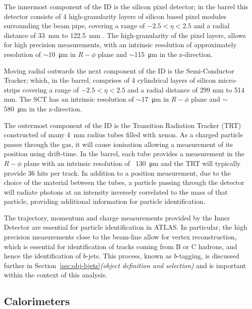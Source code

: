 The innermost component of the ID is the silicon pixel detector;
in the barrel this detector consists of 4 high-granularity layers of silicon based pixel modules surrounding the beam pipe,
covering a range of $-2.5 < \eta < 2.5$ and a radial distance of \SI{33}{mm} to \SI{122.5}{mm} \cite{det-IBL_TDR, det-IBL_Talk}.
The high-granularity of the pixel layers, allows for high precision measurements,
with an intrinsic resolution of approximately resolution of $\sim$\SI{10}{\micro\metre} in $R-\phi$ plane
and $\sim$\SI{115}{\micro\metre} in the z-direction. 

Moving radial outwards the next component of the ID is the Semi-Conductor Tracker;
which, in the barrel, comprises of 4 cylindrical layers of silicon micro-strips
covering a range of $-2.5 < \eta < 2.5$ and a radial distance of 299 mm to 514 mm.
The SCT has an intrinsic resolution of $\sim$\SI{17}{\micro\metre} in $R-\phi$ plane
and $\sim$\SI{580}{\micro\metre} in the z-direction. 

The outermost component of the ID is the Transition Radiation Tracker (TRT)
constructed of many \SI{4}{\mm} radius tubes filled with xenon.
As a charged particle passes through the gas,
it will cause ionisation allowing a measurement of its position using drift-time.
In the barrel, each tube provides a measurement in the $R-\phi$ plane
with an intrinsic resolution of ~\SI{130}{\micro\metre}
and the TRT will typically provide 36 hits per track.
In addition to a position measurement, due to the choice of the material between the tubes,
a particle passing through the detector will radiate photons
at an intensity inversely correlated to the mass of that particle,
providing additional information for particle identification. 

The trajectory, momentum and charge measurements provided by the Inner Detector are essential for particle identification in ATLAS.
In particular, the high precision measurements close to the beam-line allow for vertex reconstruction,
which is essential for identification of tracks coming from B or C hadrons, and hence the identification of $b$-jets.
This process, known as $b$-tagging, is discussed further in Section~\ref{sec:obj-bjets}\textit{(object definition and selection)}
and is important within the context of this analysis. 

\subsection{Calorimeters}
\label{sec:det-calo}


